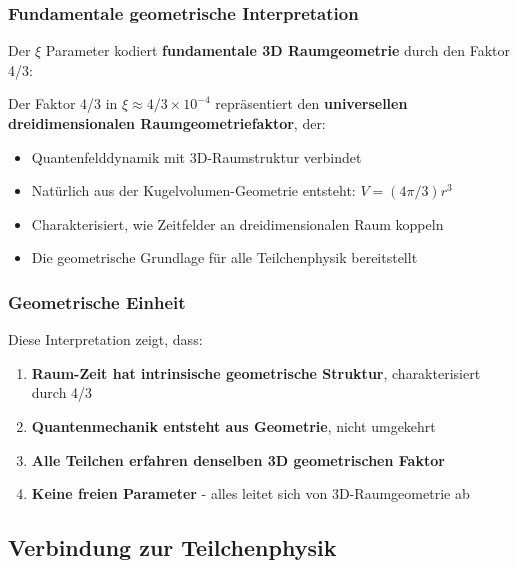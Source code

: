 \documentclass[12pt,a4paper]{article}
\newcommand{\xipar}{\ensuremath{\xi}}
\newcommand{\mypi}{\ensuremath{\pi}}
\newcommand{\mytimes}{\ensuremath{\times}}
\newcommand{\myapprox}{\ensuremath{\approx}}
\begin{document}
	\subsubsection{Fundamentale geometrische Interpretation}
	\label{subsubsec:fundamentale_interpretation}
	
	Der $\xi$ Parameter kodiert \textbf{fundamentale 3D Raumgeometrie} durch den Faktor 4/3:
	
	\begin{tcolorbox}[colback=yellow!5!white,colframe=orange!75!black,title=Dreidimensionaler Raumgeometriefaktor]
		Der Faktor 4/3 in $\xipar \myapprox 4/3 \mytimes 10^{-4}$ repräsentiert den \textbf{universellen dreidimensionalen Raumgeometriefaktor}, der:
		\begin{itemize}
			\item Quantenfelddynamik mit 3D-Raumstruktur verbindet
			\item Natürlich aus der Kugelvolumen-Geometrie entsteht: $V = (4\mypi/3)r^3$
			\item Charakterisiert, wie Zeitfelder an dreidimensionalen Raum koppeln
			\item Die geometrische Grundlage für alle Teilchenphysik bereitstellt
		\end{itemize}
	\end{tcolorbox}
	
	\subsubsection{Geometrische Einheit}
	\label{subsubsec:geometrische_einheit}
	
	Diese Interpretation zeigt, dass:
	\begin{enumerate}
		\item \textbf{Raum-Zeit hat intrinsische geometrische Struktur}, charakterisiert durch 4/3
		\item \textbf{Quantenmechanik entsteht aus Geometrie}, nicht umgekehrt
		\item \textbf{Alle Teilchen erfahren denselben 3D geometrischen Faktor}
		\item \textbf{Keine freien Parameter} - alles leitet sich von 3D-Raumgeometrie ab
	\end{enumerate}
	
	\subsection{Verbindung zur Teilchenphysik}
	\label{subsec:verbindung_teilchenphysik}
	
\end{document}
